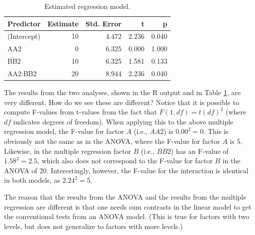 \documentclass[
  12pt,
]{krantz}
\newenvironment{Shaded}{\begin{snugshade}}{\end{snugshade}}
\newcommand{\AttributeTok}[1]{\textcolor[rgb]{0.77,0.63,0.00}{#1}}
\newcommand{\CommentTok}[1]{\textcolor[rgb]{0.56,0.35,0.01}{\textit{#1}}}
\newcommand{\DecValTok}[1]{\textcolor[rgb]{0.00,0.00,0.81}{#1}}
\newcommand{\FunctionTok}[1]{\textcolor[rgb]{0.00,0.00,0.00}{#1}}
\newcommand{\NormalTok}[1]{#1}
\newcommand{\OtherTok}[1]{\textcolor[rgb]{0.56,0.35,0.01}{#1}}
\newcommand{\SpecialCharTok}[1]{\textcolor[rgb]{0.00,0.00,0.00}{#1}}
\theoremstyle{definition}
\theoremstyle{definition}
\theoremstyle{definition}
\theoremstyle{definition}
\theoremstyle{remark}
\begin{document}
\begin{table}[h]

\caption{\label{tab:table17}Estimated regression model.}
\centering
\begin{tabular}[t]{lrrrr}
\toprule
Predictor & Estimate & Std. Error & t & p\\
\midrule
(Intercept) & 10 & 4.472 & 2.236 & 0.040\\
AA2 & 0 & 6.325 & 0.000 & 1.000\\
BB2 & 10 & 6.325 & 1.581 & 0.133\\
AA2:BB2 & 20 & 8.944 & 2.236 & 0.040\\
\bottomrule
\end{tabular}
\end{table}

The results from the two analyses, shown in the R output and in Table \ref{tab:table17}, are very different.
How do we see these are different? Notice that it is possible to compute F-values from t-values from the fact that \(F(1,df) = t(df)^2\) \citep{snedecor1967statistical} (where \(df\) indicates degrees of freedom). When applying this to the above multiple regression model, the F-value for factor \(A\) (i.e., \(AA2\)) is \(0.00^2 = 0\). This is obviously not the same as in the ANOVA, where the F-value for factor \(A\) is \(5\). Likewise, in the multiple regression factor \(B\) (i.e., \(BB2\)) has an F-value of \(1.58^2 = 2.5\), which also does not correspond to the F-value for factor \(B\) in the ANOVA of \(20\). Interestingly, however, the F-value for the interaction is identical in both models, as \(2.24^2 = 5\).

The reason that the results from the ANOVA and the results from the multiple regression are different is that one needs sum contrasts in the linear model to get the conventional tests from an ANOVA model. (This is true for factors with two levels, but does not generalize to factors with more levels.)

\begin{Shaded}
\end{Shaded}
\end{document}
